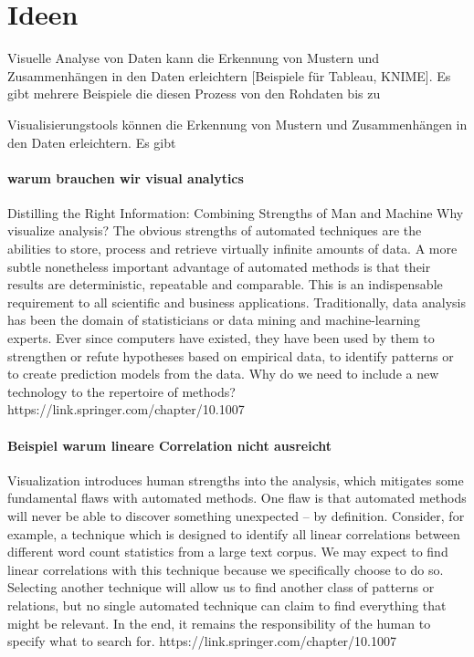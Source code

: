 \section{Ideen}
Visuelle Analyse von Daten kann die Erkennung von Mustern und Zusammenhängen in den Daten erleichtern [Beispiele für Tableau, KNIME]. Es gibt mehrere Beispiele die diesen Prozess von den Rohdaten bis zu 


Visualisierungstools können die Erkennung von Mustern und Zusammenhängen in den Daten erleichtern. Es gibt 

\paragraph{warum brauchen wir visual analytics}
Distilling the Right Information: Combining Strengths of Man and Machine
Why visualize analysis? The obvious strengths of automated techniques are the abilities to store, process and retrieve virtually infinite amounts of data. A more subtle nonetheless important advantage of automated methods is that their results are deterministic, repeatable and comparable. This is an indispensable requirement to all scientific and business applications. Traditionally, data analysis has been the domain of statisticians or data mining and machine-learning experts. Ever since computers have existed, they have been used by them to strengthen or refute hypotheses based on empirical data, to identify patterns or to create prediction models from the data. Why do we need to include a new technology to the repertoire of methods?https://link.springer.com/chapter/10.1007%

\paragraph{Beispiel warum lineare Correlation nicht ausreicht}
Visualization introduces human strengths into the analysis, which mitigates some fundamental flaws with automated methods. One flaw is that automated methods will never be able to discover something unexpected – by definition. Consider, for example, a technique which is designed to identify all linear correlations between different word count statistics from a large text corpus. We may expect to find linear correlations with this technique because we specifically choose to do so. Selecting another technique will allow us to find another class of patterns or relations, but no single automated technique can claim to find everything that might be relevant. In the end, it remains the responsibility of the human to specify what to search for. https://link.springer.com/chapter/10.1007%

